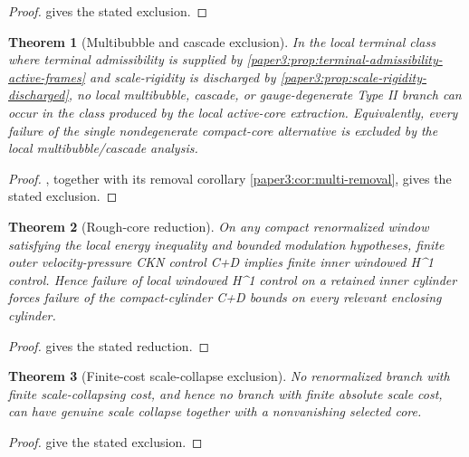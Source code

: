 \documentclass[11pt]{amsart}
\def\({}%
\def\){}%
\theoremstyle{plain}
\newtheorem{theorem}{Theorem}[section]
\theoremstyle{definition}
\theoremstyle{remark}
\begin{document}
\begin{proof}
 gives the stated exclusion.
\end{proof}

\begin{theorem}[Multibubble and cascade exclusion]
\label{paper6:thm:multibubble}
In the local terminal class where terminal admissibility is supplied by
\cref{paper3:prop:terminal-admissibility-active-frames} and scale-rigidity is discharged by
\cref{paper3:prop:scale-rigidity-discharged}, no local multibubble, cascade, or
gauge-degenerate Type II branch can occur in the class produced by the local
active-core extraction.  Equivalently, every failure of the single
nondegenerate compact-core alternative is excluded by the local
multibubble/cascade analysis.
\end{theorem}

\begin{proof}
, together with its removal corollary
\cref{paper3:cor:multi-removal}, gives the stated exclusion.
\end{proof}

\begin{theorem}[Rough-core reduction]
\label{paper6:thm:rough-core}
On any compact renormalized window satisfying the local energy inequality and
bounded modulation hypotheses, finite outer velocity-pressure CKN control
\(\mathcal C+\mathcal D\) implies finite inner windowed \(H^1\) control.  Hence
failure of local windowed \(H^1\) control on a retained inner cylinder forces
failure of the compact-cylinder \(\mathcal C+\mathcal D\) bounds on every
relevant enclosing cylinder.
\end{theorem}

\begin{proof}
 gives the stated reduction.
\end{proof}

\begin{theorem}[Finite-cost scale-collapse exclusion]
\label{paper6:thm:scale-cost}
No renormalized branch with finite scale-collapsing cost, and hence no branch
with finite absolute scale cost, can have genuine scale collapse together with a
nonvanishing selected core.
\end{theorem}

\begin{proof}
 give the stated exclusion.
\end{proof}
\end{document}
